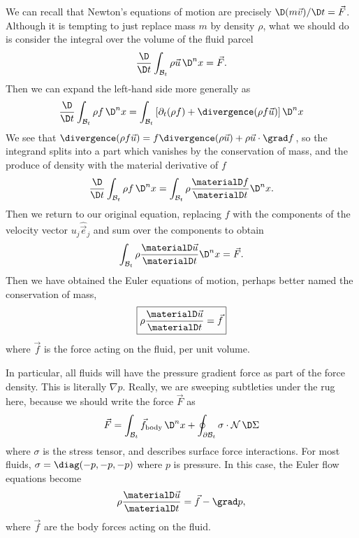 \begin{node}\label{fluids:euler-flow-0001}%
We can recall that Newton's equations of motion are precisely
$\D(m\vec{v})/\D t = \vec{F}$. Although it is tempting to just replace
mass $m$ by density $\rho$, what we should do is consider the integral
over the volume of the fluid parcel
\begin{equation}
\frac{\D}{\D t}\int_{\mathcal{B}_{t}}\rho\vec{u}\,\D^{n}x = \vec{F}.
\end{equation}
Then we can expand the left-hand side more generally as
\begin{equation}
\frac{\D}{\D t}\int_{\mathcal{B}_{t}}\rho f\,\D^{n}x = 
\int_{\mathcal{B}_{t}}\left[\partial_{t}(\rho f)+\divergence(\rho f\vec{u})\right]\D^{n}x
\end{equation}
We see that $\divergence(\rho
f\vec{u})=f\divergence(\rho\vec{u})+\rho\vec{u}\cdot\grad f$, so the
integrand splits into a part which vanishes by the conservation of mass,
and the produce of density with the material derivative of $f$
\begin{equation}
\frac{\D}{\D t}\int_{\mathcal{B}_{t}}\rho f\,\D^{n}x = 
\int_{\mathcal{B}_{t}}\rho\frac{\materialD f}{\materialD t}\D^{n}x.
\end{equation}
Then we return to our original equation, replacing $f$ with the
components of the velocity vector $u_{j}\widehat{\vec{e}}_{j}$
and sum over the components to obtain
\begin{equation}
\int_{\mathcal{B}_{t}}\rho\frac{\materialD\vec{u}}{\materialD t}\D^{n}x = \vec{F}.
\end{equation}
Then we have obtained the Euler equations of motion, perhaps better
named the conservation of mass,
\begin{equation}
\boxed{\rho\frac{\materialD\vec{u}}{\materialD t}=\vec{f}}
\end{equation}
where $\vec{f}$ is the force acting on the fluid, per unit volume.

\begin{node}\label{fluids:euler-flow-0005}%
In particular, all fluids will have the pressure gradient force as part
of the force density. This is literally $\nabla p$. Really, we are
sweeping subtleties under the rug here, because we should write the
force $\vec{F}$ as
\begin{equation*}
\vec{F}=\int_{\mathcal{B}_{t}}\vec{f}_{\text{body}}\,\D^{n}x+\oint_{\partial\mathcal{B}_{t}}\sigma\cdot\mathcal{N}\,\D\Sigma
\end{equation*}
where $\sigma$ is the stress tensor, and describes surface force
interactions. For most fluids, $\sigma=\diag(-p,-p,-p)$ where $p$ is pressure.
In this case, the Euler flow equations become
\begin{equation}
\rho\frac{\materialD\vec{u}}{\materialD t}=\vec{f}-\grad p,
\end{equation}
where $\vec{f}$ are the body forces acting on the fluid.
\end{node}


\end{node}
